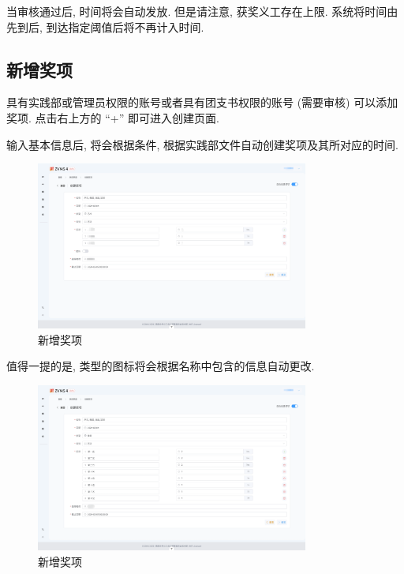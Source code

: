 \documentclass{article}
\begin{document}
当审核通过后, 时间将会自动发放. 但是请注意, 获奖义工存在上限. 系统将时间由先到后, 到达指定阈值后将不再计入时间.

\subsection{新增奖项}

具有实践部或管理员权限的账号或者具有团支书权限的账号 (需要审核) 可以添加奖项. 点击右上方的 ``+'' 即可进入创建页面.

输入基本信息后, 将会根据条件, 根据实践部文件自动创建奖项及其所对应的时间.

\begin{figure}[H]
  \centering
  \includegraphics[width=0.8\textwidth]{../assets/image-20240303163408089.png}
  \caption{新增奖项}
  \label{fig:trophy-add-new}
\end{figure}

值得一提的是, 类型的图标将会根据名称中包含的信息自动更改.

\begin{figure}[H]
  \centering
  \includegraphics[width=0.8\textwidth]{../assets/image-20240303163528095.png}
  \caption{新增奖项}
  \label{fig:trophy-add-new-icon}
\end{figure}
\end{document}
